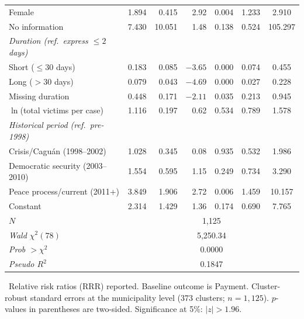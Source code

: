 {\begin{longtable}{@{}l r r r r c c@{}}
Female & 1.894 & 0.415 & 2.92 & 0.004 & 1.233 & 2.910 \\
No information & 7.430 & 10.051 & 1.48 & 0.138 & 0.524 & 105.297 \\
\addlinespace
\textit{Duration (ref.\ express $\le 2$ days)} & & & & & & \\
Short ($\le 30$ days) & 0.183 & 0.085 & $-3.65$ & 0.000 & 0.074 & 0.455 \\
Long ($>30$ days) & 0.079 & 0.043 & $-4.69$ & 0.000 & 0.027 & 0.228 \\
Missing duration & 0.448 & 0.171 & $-2.11$ & 0.035 & 0.213 & 0.945 \\
\addlinespace
$\ln$(total victims per case) & 1.116 & 0.197 & 0.62 & 0.534 & 0.789 & 1.578 \\
\addlinespace
\textit{Historical period (ref.\ pre-1998)} & & & & & & \\
Crisis/Cagu\'an (1998--2002) & 1.028 & 0.345 & 0.08 & 0.935 & 0.532 & 1.986 \\
Democratic security (2003--2010) & 1.554 & 0.595 & 1.15 & 0.249 & 0.734 & 3.290 \\
Peace process/current (2011+) & 3.849 & 1.906 & 2.72 & 0.006 & 1.459 & 10.157 \\
\addlinespace
Constant & 2.314 & 1.429 & 1.36 & 0.174 & 0.690 & 7.765 \\
\midrule
\addlinespace
\textit{$N$} & \multicolumn{6}{c}{1,125} \\
\textit{Wald $\chi^2(78)$} & \multicolumn{6}{c}{5,250.34} \\
\textit{Prob $>\chi^2$} & \multicolumn{6}{c}{0.0000} \\
\textit{Pseudo $R^2$} & \multicolumn{6}{c}{0.1847} \\
\end{longtable}
}
\tabnote\ Relative risk ratios (RRR) reported. Baseline outcome is Payment.
Cluster-robust standard errors at the municipality level (373 clusters;
$n=1{,}125$). $p$-values in parentheses are two-sided. Significance at 5\%:
$|z|>1.96$.
\tabsource
